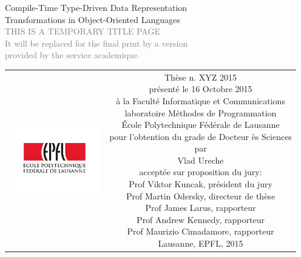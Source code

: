 \begin{titlepage}
\begin{center}
\sffamily


\null\vspace{2cm}
{\huge Compile-Time Type-Driven Data Representation\\[12pt] Transformations in Object-Oriented Languages} \\[24pt]
\textcolor{gray}{\small{THIS IS A TEMPORARY TITLE PAGE \\ It will be replaced for the final print by a version \\ provided by the service academique.}}

\vfill

\begin{tabular} {cc}
\parbox{0.3\textwidth}{\includegraphics[width=4cm]{images/epfl}}
&
\parbox{0.7\textwidth}{%
	Thèse n. XYZ 2015\\
	présenté le 16 Octobre 2015\\
	à la Faculté Informatique et Communications\\
	laboratoire Méthodes de Programmation\\[2em]
%
	École Polytechnique Fédérale de Lausanne\\[6pt]
	pour l'obtention du grade de Docteur ès Sciences\\
	par\\ [4pt]
	\null \hspace{3em} Vlad Ureche\\[9pt]
%
\small
acceptée sur proposition du jury:\\[4pt]
%
    Prof Viktor Kuncak, président du jury\\
    Prof Martin Odersky, directeur de thèse\\
    Prof James Larus, rapporteur\\
    Prof Andrew Kennedy, rapporteur\\
    Prof Maurizio Cimadamore, rapporteur\\[12pt]
%
Lausanne, EPFL, 2015}
\end{tabular}
\end{center}
\vspace{2cm}
\end{titlepage}



